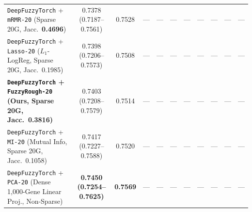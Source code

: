 \documentclass[10pt,twocolumn]{article}
\begin{document}
\begin{table}[t]
{\begin{tabular}{@{}>{\raggedright\arraybackslash}p{5.55cm}cccccccccc@{}}
\texttt{DeepFuzzyTorch} + \texttt{mRMR-20} \cite{peng2005feature} (Sparse 20G, Jacc.\
\textbf{0.4696}) & 0.7378 (0.7187--0.7561) & 0.7528 & --- & --- & --- & --- & --- & --- &
--- & --- \\
\texttt{DeepFuzzyTorch} + \texttt{Lasso-20} ($L_1$-LogReg, Sparse 20G, Jacc.\ 0.1985) &
0.7398 (0.7206--0.7573) & 0.7508 & --- & --- & --- & --- & --- & --- & --- & --- \\
\textbf{\texttt{DeepFuzzyTorch} + \texttt{FuzzyRough-20} (Ours, Sparse 20G, Jacc.\ 0.3816)} &
0.7403 (0.7208--0.7579) & 0.7514 & --- & --- & --- & --- & --- & --- & --- & --- \\
\texttt{DeepFuzzyTorch} + \texttt{MI-20} (Mutual Info, Sparse 20G, Jacc.\ 0.1058) &
0.7417 (0.7227--0.7588) & 0.7520 & --- & --- & --- & --- & --- & --- & --- & --- \\
\texttt{DeepFuzzyTorch} + \texttt{PCA-20} (Dense 1,000-Gene Linear Proj., Non-Sparse) &
\textbf{0.7450 (0.7254--0.7625)} & \textbf{0.7569} & --- & --- & --- & --- & --- & --- & ---
& --- \\
\bottomrule
\end{tabular}%
}

\vspace{0.15em}


\end{table}
\end{document}
